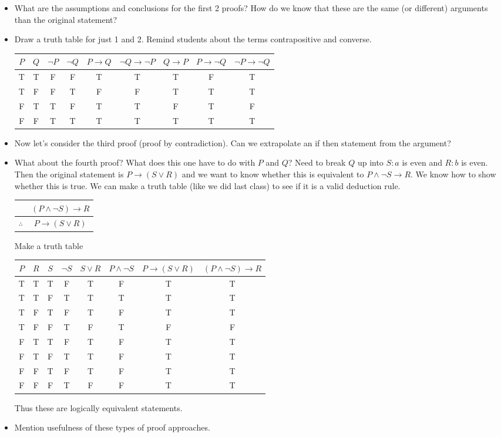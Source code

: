 \documentclass[12pt]{article}
\theoremstyle{plain}
\theoremstyle{definition}
\theoremstyle{remark}
\def\imp{\rightarrow}
\begin{document}
\begin{itemize}
\item What are the assumptions and conclusions for the first 2 proofs? How do we know that these are the same (or different) arguments than the original statement?
\item Draw a truth table for just 1 and 2. Remind students about the terms contrapositive and converse.
 \begin{center}
  \begin{tabular}{c|c|c|c||c|c|c|c|c}
   $P$ & $Q$ & $\neg P$ & $\neg Q$ & $P\imp Q$ & $\neg Q \imp \neg P$ & $Q \imp P$ & $P \imp \neg Q$ & $\neg P \imp \neg Q$\\ \hline
   T & T & F & F & T & T & T & F & T\\
   T & F & F & T & F & F & T & T & T\\
   F & T & T & F & T & T & F & T & F\\
   F & F & T & T & T & T & T & T & T
  \end{tabular}
 \end{center}
 \item Now let's consider the third proof (proof by contradiction). Can we extrapolate an if then statement from the argument?
 \item What about the fourth proof? What does this one have to do with $P$ and $Q$? Need to break $Q$ up into $S: a$ is even and $R: b$ is even. Then the original statement is $P \imp (S \vee R)$ and we want to know whether this is equivalent to $P \wedge \neg S \imp R$. We know how to show whether this is true. We can make a truth table (like we did last class) to see if it is a valid deduction rule.
 \begin{center}
  \begin{tabular}{rc}
   &  $(P \wedge \neg S) \imp R$ \\ \hline
 $\therefore$  & $P \imp (S \vee R)$
  \end{tabular}
  \end{center}
  Make a truth table
   \begin{center}
  \begin{tabular}{c|c|c|c|c|c||c|c}
   $P$ & $R$ & $S$ & $\neg S$ & $S\vee R$ & $P\wedge \neg S$ & $P\imp (S\vee R)$ & $(P\wedge \neg S)\imp R$\\ \hline
   T & T & T & F & T & F & T & T \\
   T & T & F & T & T & T & T & T \\
   T & F & T & F & T & F & T & T \\
   T & F & F & T & F & T & F & F \\
   F & T & T & F & T & F & T & T \\
   F & T & F & T & T & F & T & T \\
   F & F & T & F & T & F & T & T \\
   F & F & F & T & F & F & T & T
  \end{tabular}
 \end{center}
 Thus these are logically equivalent statements.
 \item Mention usefulness of these types of proof approaches.
\end{itemize}
\end{document}
